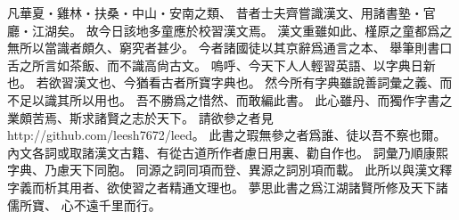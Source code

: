 凡華夏・雞林・扶桑・中山・安南之類、
昔者士夫齊嘗識漢文、用諸書塾・官廳・江湖矣。
故今日該地多童應於校習漢文焉。
漢文重雖如此、槿原之童都爲之無所以當識者頗久、窮究者甚少。
今者諸國徒以其京辭爲通言之本、
舉筆則書口舌之所言如茶飯、而不識高尙古文。
嗚呼、今天下人人輕習英語、以字典日新也。
若欲習漢文也、今猶看古者所寶字典也。
然今所有字典雖說善詞彙之義、而不足以識其所以用也。
吾不勝爲之惜然、而敢編此書。
此心雖丹、而獨作字書之業頗苦焉、斯求諸賢之志於天下。
請欲參之者見 http://github.com/leesh7672/leed。
此書之瑕無參之者爲誰、徒以吾不察也爾。
內文各詞或取諸漢文古籍、有從古道所作者慮日用裏、勸自作也。
詞彙乃順康熙字典、乃慮天下同胞。
同源之詞同項而登、異源之詞別項而載。
此所以與漢文釋字義而析其用者、欲使習之者精通文理也。
夢思此書之爲江湖諸賢所修及天下諸儒所寶、
心不遠千里而行。
